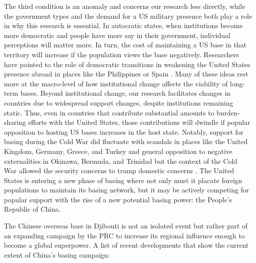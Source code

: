 The third condition is an anomaly and concerns our research less directly, while the government types and the demand for a US military presence both play a role in why this research is essential. In autocratic states, when institutions become more democratic and people have more say in their government, individual perceptions will matter more. In turn, the cost of maintaining a US base in that territory will increase if the population views the base negatively. Researchers have pointed to the role of democratic transitions in weakening the United States presence abroad in places like the Philippines or Spain \cite{calder2007,cooley2008}. Many of these ideas rest more at the macro-level of how institutional change affects the viability of long-term bases. Beyond institutional change, our research facilitates changes in countries due to widespread support changes, despite institutions remaining static. Thus, even in countries that contribute substantial amounts to burden-sharing efforts with the United States, those contributions will dwindle if popular opposition to hosting US bases increases in the host state. Notably, support for basing during the Cold War did fluctuate with scandals in places like the United Kingdom, Germany, Greece, and Turkey and general opposition to negative externalities in Okinawa, Bermuda, and Trinidad but the context of the Cold War allowed the security concerns to trump domestic concerns \cite{cottrellmoorer1977,high2008}. The United States is entering a new phase of basing where not only must it placate foreign populations to maintain its basing network, but it may be actively competing for popular support with the rise of a new potential basing power: the People's Republic of China. 

The Chinese overseas base in Djibouti is not an isolated event but rather part of an expanding campaign by the PRC to increase its regional influence enough to become a global superpower. A list of recent developments that show the current extent of China's basing campaign:

